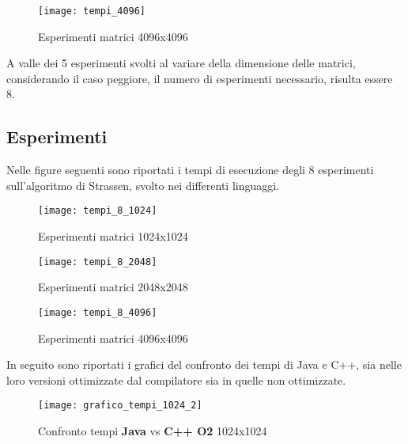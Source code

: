 \begin{figure}[!htbp]
  \texttt{[image: tempi\_4096]}
  \caption{Esperimenti matrici 4096x4096}
  \label{prodottomatrici_tempi_4096}
\end{figure}

\clearpage

A valle dei 5 esperimenti svolti al variare della dimensione delle matrici,
considerando il caso peggiore, il numero di esperimenti necessario,
risulta essere 8.\\

\subsection{Esperimenti}

Nelle figure seguenti sono riportati i tempi di esecuzione degli 8 esperimenti
sull'algoritmo di Strassen, svolto nei differenti linguaggi.\\

\begin{figure}[!htbp]
  \texttt{[image: tempi\_8\_1024]}
  \caption{Esperimenti matrici 1024x1024}
  \label{prodottomatrici_tempi_8_1024}
\end{figure}

\begin{figure}[!htbp]
  \texttt{[image: tempi\_8\_2048]}
  \caption{Esperimenti matrici 2048x2048}
  \label{prodottomatrici_tempi_8_2048}
\end{figure}

\begin{figure}[!htbp]
  \texttt{[image: tempi\_8\_4096]}
  \caption{Esperimenti matrici 4096x4096}
  \label{prodottomatrici_tempi_8_4096}
\end{figure}

\clearpage

In seguito sono riportati i grafici del confronto dei tempi di Java e C++, sia
nelle loro versioni ottimizzate dal compilatore sia in quelle non ottimizzate.\\

\begin{figure}[!htbp]
  \texttt{[image: grafico\_tempi\_1024\_2]}
  \caption{Confronto tempi \textbf{Java} vs \textbf{C++ O2} 1024x1024}
  \label{prodottomatrici_grafico_tempi_1024_2}
\end{figure}

